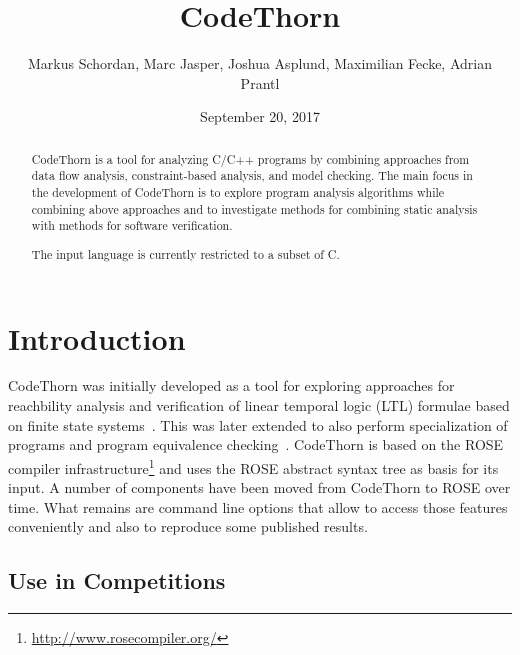 \documentclass[natbib]{article}
\begin{document}
\title{CodeThorn}

\author{\small Markus Schordan, Marc Jasper, Joshua Asplund, Maximilian Fecke, Adrian Prantl}
\date{September 20, 2017}

\maketitle

\begin{abstract}
\noindent CodeThorn is a tool for analyzing C/C++ programs by combining approaches
from data flow analysis, constraint-based analysis, and model
checking. The main focus in the development of CodeThorn is to explore program analysis algorithms while combining above
approaches and to investigate methods for combining static analysis with
methods for software verification.

The input language is currently restricted to a subset of C.

\end{abstract}

\tableofcontents


\section{Introduction}
\label{sec:intro}

CodeThorn was initially developed as a tool for exploring approaches
for reachbility analysis and verification of linear temporal logic (LTL)
formulae based on finite state systems~\cite{schordan2014combining}. 
This was later extended to
also perform specialization of programs and program equivalence
checking~\cite{schordan2014verification}. CodeThorn is based on the 
ROSE compiler infrastructure\footnote{\url{http://www.rosecompiler.org/}} 
and uses the ROSE abstract syntax tree as basis for its input. 
A number of components have been moved
from CodeThorn to ROSE over time. What remains are command line
options that allow to access those features conveniently and also to
reproduce some published results.

\nocite{roseWWW}

\subsection{Use in Competitions}
\end{document}
